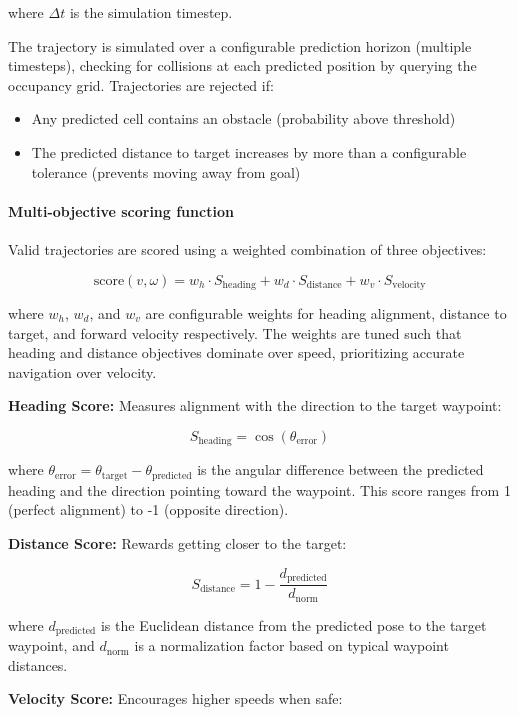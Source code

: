 \documentclass{article}
\begin{document}
\noindent where $\Delta t$ is the simulation timestep.

The trajectory is simulated over a configurable prediction horizon (multiple timesteps), checking for collisions at each predicted position by querying the occupancy grid. Trajectories are rejected if:
\begin{itemize}
    \item Any predicted cell contains an obstacle (probability above threshold)
    \item The predicted distance to target increases by more than a configurable tolerance (prevents moving away from goal)
\end{itemize}

\paragraph{Multi-objective scoring function}

Valid trajectories are scored using a weighted combination of three objectives:

$$
\text{score}(v, \omega) = w_h \cdot S_{\text{heading}} + w_d \cdot S_{\text{distance}} + w_v \cdot S_{\text{velocity}}
$$

\noindent where $w_h$, $w_d$, and $w_v$ are configurable weights for heading alignment, distance to target, and forward velocity respectively. The weights are tuned such that heading and distance objectives dominate over speed, prioritizing accurate navigation over velocity.

\textbf{Heading Score:} Measures alignment with the direction to the target waypoint:

$$
S_{\text{heading}} = \cos(\theta_{\text{error}})
$$

\noindent where $\theta_{\text{error}} = \theta_{\text{target}} - \theta_{\text{predicted}}$ is the angular difference between the predicted heading and the direction pointing toward the waypoint. This score ranges from 1 (perfect alignment) to -1 (opposite direction).

\textbf{Distance Score:} Rewards getting closer to the target:

$$
S_{\text{distance}} = 1 - \frac{d_{\text{predicted}}}{d_{\text{norm}}}
$$

\noindent where $d_{\text{predicted}}$ is the Euclidean distance from the predicted pose to the target waypoint, and $d_{\text{norm}}$ is a normalization factor based on typical waypoint distances.

\textbf{Velocity Score:} Encourages higher speeds when safe:
\end{document}
